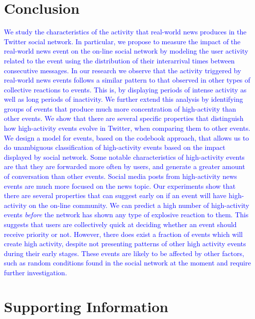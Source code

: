 \documentclass[10pt,letterpaper]{article}
\begin{document}
\section*{Conclusion}

\textcolor{blue}{We study the characteristics of the activity that real-world news produces
in the Twitter social network. In particular, we propose to measure the impact of the
real-world news event on the on-line social network by modeling the user
activity related to the event using the distribution of their
interarrival times between consecutive messages. In our research we observe
that the activity triggered by real-world news events follows a similar
pattern to that observed in other types of collective reactions to events.
This is, by displaying periods of intense activity as well as long periods of
inactivity. We further extend this analysis by identifying groups of events
that produce much more concentration of high-activity than other events. 
We show that there are several specific properties that distinguish how
high-activity events evolve in Twitter, when comparing them to other
events. We design a model for events, based on the codebook approach, that allows us to do
unambiguous classification of high-activity events based on the impact
displayed by social network. %
Some notable
characteristics of high-activity events are that they are forwarded more
often by users, and generate a greater amount of conversation than
other events.  Social media posts from high-activity news events are
much more focused on the news topic. Our experiments show that there
are several properties that can suggest early on if an event will have
high-activity on the on-line community.  We can predict a high number of
high-activity events {\em before} the network has shown any type of
explosive reaction to them. %
This suggests that users are collectively quick at deciding whether an
event should receive priority or not.  However, there does exist a fraction of
events which will create high activity, despite not presenting
patterns of other high activity events during their early stages.  These
events are likely to be affected by other factors, such as random
conditions found in the social network at the moment and require
further investigation.}

\section*{Supporting Information}
\end{document}
